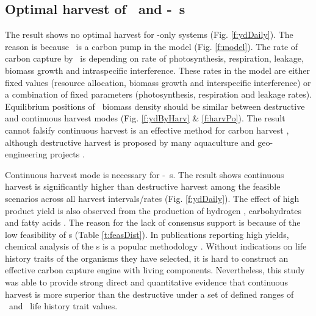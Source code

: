 \documentclass[../thesis.tex]{subfiles} %
\begin{document}
\subsection{Optimal harvest of \phy\ and \phy-\bac\ \pbs s}
The result shows no optimal harvest for \phy-only systems (Fig. \ref{f:ydDaily}).  The reason is because \phy\ is a carbon pump in the model (Fig. \ref{f:model}).  The rate of carbon capture by \phy\ is depending on rate of photosynthesis, respiration, leakage, biomass growth and intraspecific interference.  These rates in the model are either fixed values (resource allocation, biomass growth and interspecific interference) or a combination of fixed parameters (photosynthesis, respiration and leakage rates).  Equilibrium positions of \phy\ biomass density should be similar between destructive and continuous harvest modes (Fig. \ref{f:ydByHarv} \& \ref{f:harvPo}).  The result cannot falsify continuous harvest is an effective method for carbon harvest \autocite{fuentes2016impact}, although destructive harvest is proposed by many aquaculture and geo-engineering projects \autocite{lawrence2014efficiency,krause2016substantial}.

Continuous harvest mode is necessary for \phy-\bac\ \pbs s.  The result shows continuous harvest is significantly higher than destructive harvest among the feasible scenarios across all harvest intervals/rates (Fig. \ref{f:ydDaily}).  The effect of high product yield is also observed from the production of hydrogen \autocite{kim2008anaerobic}, carbohydrates \autocite{choix2012enhanced1,choix2012enhanced2} and fatty acids \autocite{leyva2014accumulation}.  The reason for the lack of consensus support is because of the low feasibility of \pbs s (Table \ref{t:feasDist}).  In publications reporting high yields, chemical analysis of the \pbs s is a popular methodology \autocite{santos2014microalgal,rivas2010interactions,leyva2014accumulation,amin2009photolysis}.  Without indications on life history traits of the organisms they have selected, it is hard to construct an effective carbon capture engine with living components.  Nevertheless, this study was able to provide strong direct and quantitative evidence that continuous harvest is more superior than the destructive under a set of defined ranges of \phy\ and \bac\ life history trait values.
\end{document}
